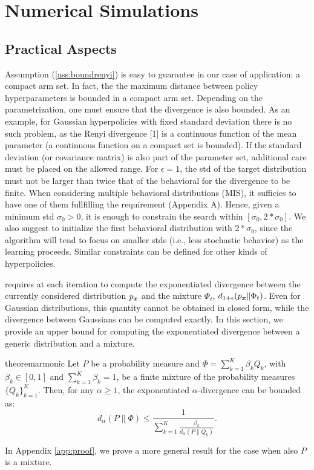 
\chapter{Numerical Simulations} \label{ch:experiments}

\section{Practical Aspects} \label{sec:practical}

\begin{remark}
Assumption (\ref{ass:boundrenyi}) is easy to guarantee in our case of application: a compact arm set. In fact, the the maximum distance between policy hyperparameters is bounded in a compact arm set. Depending on the parametrization, one must ensure that the \Renyi divergence is also bounded. As an example, for Gaussian hyperpolicies with fixed standard deviation there is no such problem, as the Renyi divergence [1] is a continuous function of the mean parameter (a continuous function on a compact set is bounded). If the standard deviation (or covariance matrix) is also part of the parameter set, additional care must be placed on the allowed range. For $\epsilon=1$, the std of the target distribution must not be larger than twice that of the behavioral for the divergence to be finite. When considering multiple behavioral distributions (MIS), it sufficies to have one of them fullfilling the requirement (Appendix A). Hence, given a minimum std $\sigma_0 > 0$, it is enough to constrain the search within $[\sigma_0, 2*\sigma_0]$. We also suggest to initialize the first behavioral distribution with $2*\sigma_0$, since the algorithm will tend to focus on smaller stds (i.e., less stochastic behavior) as the learning proceeds. Similar constraints can be defined for other kinds of hyperpolicies.
\end{remark}

\algoname requires at each iteration to compute the exponentiated \Renyi divergence between the currently considered distribution $p_{\boldsymbol{x}}$ 
and the mixture $\Phi_t$, \ie $d_{1+\epsilon}(p_{\boldsymbol{x}}\|\Phi_t)$. Even for Gaussian distributions, this quantity cannot be obtained in closed form, while
the \Renyi divergence between Gaussians can be computed exactly. In this section, we provide an upper bound for computing the exponentiated \Renyi divergence
between a generic distribution and a mixture.
\begin{restatable}{theorem}{armonic}\label{th:armonic}
	Let $P$ be a probability measure and $\Phi = \sum_{k=1}^K \beta_k Q_k$, with $\beta_k \in [0,1]$ and $\sum_{k=1}^K \beta_k =1$, be a finite mixture of the
	probability measures $\{Q_k\}_{k=1}^K$. Then, for any $\alpha \ge 1$, the exponentiated $\alpha$-\Renyi divergence can be bounded as: 
	\begin{equation*}
	d_{\alpha}(P \| \Phi) \le \frac{1} {\sum_{k=1}^K \frac{ \beta_k}{ d_{\alpha}(P \| Q_k)}}.
	\end{equation*}
\end{restatable}

In Appendix \ref{app:proof}, we prove a more general result for the case when also $P$ is a mixture.